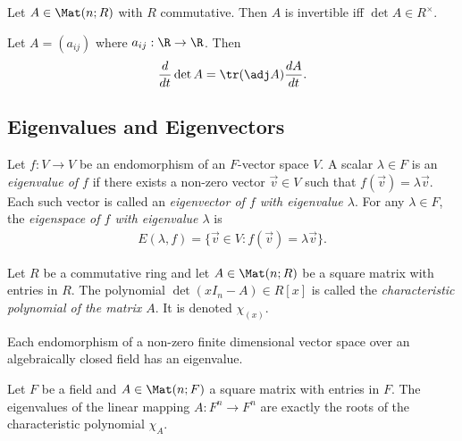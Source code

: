 \documentclass{article}
\begin{document}
\begin{corollary}[Notes 4.4.11]
    Let $A\in\Mat(n;R)$ with $R$ commutative. Then $A$ is invertible iff $\det A\in R^\times$. 
\end{corollary}

\begin{theorem}
    Let $A=(a_{ij})$ where $a_{ij}:\R\to\R$. Then
    \begin{align*}
        \frac{d}{dt}\det A = \tr(\adj A)\frac{dA}{dt}.
    \end{align*} 
\end{theorem}

\subsection{Eigenvalues and Eigenvectors}

\begin{definition}
    Let $f:V\to V$ be an endomorphism of an $F$-vector space $V$. A scalar $\lambda\in F$ is 
    an \emph{eigenvalue of $f$} if there exists a non-zero vector $\vec v \in V$ such that 
    $f(\vec v)=\lambda \vec v$. Each such vector is called an \emph{eigenvector of $f$ with 
    eigenvalue $\lambda$}. For any $\lambda\in F$, the \emph{eigenspace of $f$ with eigenvalue $\lambda$}
    is 
    \begin{align*}
        E(\lambda,f) = \{\vec v\in V:f(\vec v)=\lambda\vec v\}.
    \end{align*}
\end{definition}

\begin{definition}
    Let $R$ be a commutative ring and let $A\in\Mat(n; R)$ be a square matrix with entries in $R$.
    The polynomial $\det(xI_n-A)\in R[x]$ is called the \emph{characteristic polynomial of the matrix 
    $A$}. It is denoted $\chi_(x)$.
\end{definition}

\begin{theorem}[Notes 4.5.4]
    Each endomorphism of a non-zero finite dimensional vector space over an algebraically closed field 
    has an eigenvalue.
\end{theorem}

\begin{theorem}[Notes 4.5.8]
    Let $F$ be a field and $A\in\Mat(n;F)$ a square matrix with entries in $F$. The eigenvalues of the 
    linear mapping $A:F^n\to F^n$ are exactly the roots of the characteristic polynomial $\chi_A$. 
\end{theorem}
\end{document}
